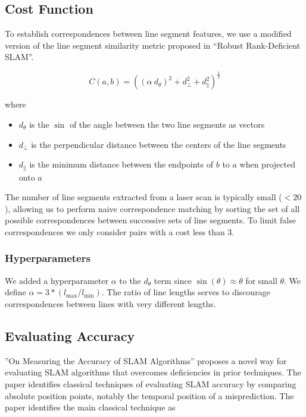 \documentclass[11pt]{article}
\begin{document}
\subsection{Cost Function}

To establish correspondences between line segment features, we use a modified version of the line segment similarity metric proposed in ``Robust Rank-Deficient SLAM''\cite{Nashed2021RobustRD}.

$$C(a, b) = ((\alpha\ d_\theta)^2 + d_\bot^2 + d_\parallel^2)^\frac{1}{2}$$

where 
\begin{itemize}
    \item $d_\theta$ is the $\sin$ of the angle between the two line segments as vectors
    \item $d_\bot$ is the perpendicular distance between the centers of the line segments
    \item $d_\parallel$ is the minimum distance between the endpoints of $b$ to $a$ when projected onto $a$
\end{itemize}

The number of line segments extracted from a laser scan is typically small ($< 20$), allowing us to perform naive correspondence matching by sorting the set of all possible correspondences between successive sets of line segments. To limit false correspondences we only consider pairs with a cost less than 3.

\subsubsection{Hyperparameters}

We added a hyperparameter $\alpha$ to the $d_\theta$ term since $\sin(\theta) \approx \theta$ for small $\theta$. We define $\alpha = 3 * (l_{\max} / l_{\min})$. The ratio of line lengths serves to discourage correspondences between lines with very different lengths.

\subsection{Evaluating Accuracy}
''On Measuring the Accuracy of SLAM Algorithms''\cite{Kmmerle2009OnMT} proposes a novel way for evaluating SLAM algorithms that overcomes deficiencies in prior techniques. The paper identifies classical techniques of evaluating SLAM accuracy by comparing absolute position points, notably the temporal position of a misprediction. The paper identifies the main classical technique as 
\end{document}
